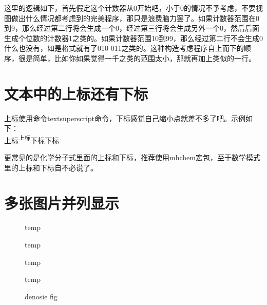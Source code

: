\documentclass[11pt,oneside]{book}
\begin{document}
这里的逻辑如下，首先假定这个计数器从0开始吧，小于0的情况不予考虑，不要视图做出什么情况都考虑到的完美程序，那只是浪费脑力罢了。如果计数器范围在0到9，那么经过第二行将会生成一个0，经过第三行将会生成另外一个0，然后后面生成个位数的计数器1之类的。如果计数器范围10到99，那么经过第二行不会生成0什么也没有，如是格式就有了010 011之类的。这种构造考虑程序自上而下的顺序，很是简单，比如你如果觉得一千之类的范围太小，那就再加上类似的一行。



\section{文本中的上标还有下标}
上标使用命令textsuperscript命令，下标感觉自己缩小点就差不多了吧。示例如下：\\
上标\textsuperscript{上标}下标{\scriptsize 下标}

更常见的是化学分子式里面的上标和下标，推荐使用mhchem宏包，至于数学模式里的上标和下标自不必说了。


\section{多张图片并列显示}
\label{sec:多张图片并列显示}

\begin{figure}[H]
\label{fig:四栏图片}
\begin{multicols}{4}
\begin{linefig}{temp}
\end{linefig}
\begin{linefig}{temp}
\end{linefig}
\begin{linefig}{temp}
\end{linefig}
\begin{linefig}{temp}
\end{linefig}
\end{multicols}
\caption{denosie fig}
\label{fig:denosie fig}
\end{figure}
\end{document}
